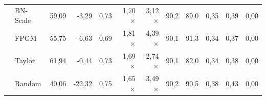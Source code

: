 \begin{table}[H]
{{\begin{tabular}{c l rr rrr rr rrr}
     & BN-Scale & 59,09 & -3,29 & 0,73 & 1,70$\times$ & 3,12$\times$ & 90,2 & 89,0 & 0,35 & 0,39 & 0,00 \\
     & FPGM & 55,75 & -6,63 & 0,69 & 1,81$\times$ & 4,39$\times$ & 90,1 & 91,3 & 0,34 & 0,37 & 0,00 \\
     & Taylor & 61,94 & -0,44 & 0,73 & 1,69$\times$ & 2,74$\times$ & 90,1 & 82,0 & 0,34 & 0,38 & 0,00 \\
     & Random & 40,06 & -22,32 & 0,75 & 1,65$\times$ & 3,49$\times$ & 90,2 & 90,5 & 0,38 & 0,43 & 0,00 \\
    \bottomrule
  \end{tabular}}}
\end{table}
